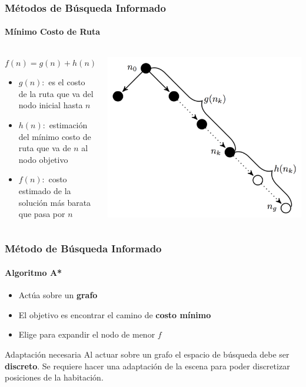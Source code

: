 \documentclass[hyperref={pdfpagelayout=SinglePage}]{beamer}
\begin{document}
\begin{frame}
\frametitle{Métodos de Búsqueda Informado}
\framesubtitle{Mínimo Costo de Ruta}
	\begin{columns}[T]
		\begin{column}{.5\textwidth}
			$f(n) = g(n) + h(n)$
			
			\begin{itemize}
				\item $g(n):$ es el costo de la ruta que va del nodo inicial hasta $n$
				\item $h(n):$ estimación del mínimo costo de ruta que va de $n$ al nodo objetivo
				\item $f(n):$ costo estimado de la solución más barata que pasa por $n$
			\end{itemize}
			
			
		\end{column}
		\begin{column}{.5\textwidth}
    			\includegraphics[width=\textwidth]{images/graph.png}
		\end{column}
	\end{columns}
\end{frame}

\begin{frame}
\frametitle{Método de Búsqueda Informado}
\framesubtitle{Algoritmo A*}
\begin{itemize}
	\item Actúa sobre un \textbf{grafo}
	\item El objetivo es encontrar el camino de \textbf{costo mínimo}
	\item Elige para expandir el nodo de menor $f$
\end{itemize}
\begin{block}{Adaptación necesaria}
Al actuar sobre un grafo el espacio de búsqueda debe ser \textbf{discreto}. Se requiere hacer una adaptación de la escena para poder discretizar posiciones de la habitación.
\end{block}
\end{frame}
\end{document}
